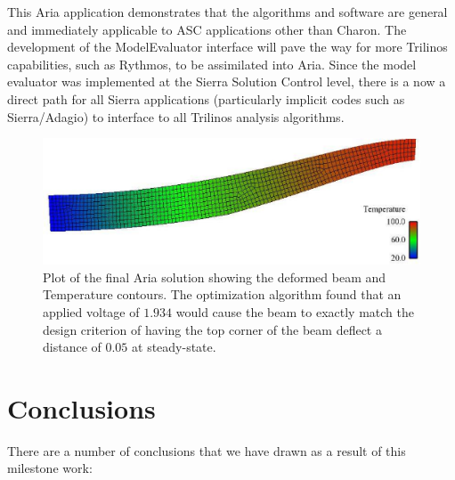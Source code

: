\documentclass[pdf,ps2pdf,11pt]{SANDreport}
\begin{document}
This Aria application demonstrates that the algorithms and software are general and immediately 
applicable to ASC applications other than Charon. The development of the ModelEvaluator
interface will pave the way for more Trilinos capabilities, such as Rythmos, to
be assimilated into Aria. Since the model evaluator was implemented at the Sierra 
Solution Control level, there is a now a direct path for all Sierra applications
(particularly implicit codes such as Sierra/Adagio) to interface to all Trilinos 
analysis algorithms.
{\bsinglespace
\begin{figure}
\begin{center}
\includegraphics*[angle=0,scale=0.50
]{SiC_dY0.1.eps}
\end{center}
\caption{
\label{fig:ariaFinal}
Plot of the final Aria solution showing the deformed beam and Temperature
contours. The optimization algorithm found that an applied voltage of $1.934$
would cause the beam to exactly match the design criterion of having the 
top corner of the beam deflect a distance of $0.05$ at steady-state.
}
\end{figure}
\esinglespace}

%
\section{Conclusions}
%

There are a number of conclusions that we have drawn as a result of this
milestone work:
\end{document}
